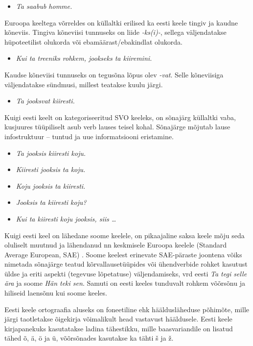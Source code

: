 \begin{multicols}{2}
\begin{itemize}
\item[] \textit{Ta saabub homme.}
\end{itemize}

Euroopa keeltega võrreldes on küllaltki erilised ka eesti keele tingiv ja kaudne kõneviis. 
Tingiva kõneviisi tunnuseks on liide \textit{-ks(i)-}, sellega väljendatakse hüpoteetilist olukorda või ebamäärast/ebakind\-lat olukorda.

\begin{itemize}
\item[] \textit{Kui ta treeniks rohkem, jookseks ta kiire\-mini.}
\end{itemize}

Kaudse kõneviisi tunnuseks on tegusõna lõpus olev \textit{-vat}. 
Selle kõneviisiga väljendatakse sündmusi, millest teatakse kuulu järgi.

\begin{itemize}
\item[] \textit{Ta jooksvat kiiresti.}
\end{itemize}

Kuigi eesti keelt on kategoriseeritud SVO keeleks, on sõnajärg küllaltki vaba, kusjuures tüüpiliselt asub verb lauses teisel kohal. Sõnajärge mõjutab lause infostruktuur -- tuntud ja uue informatsiooni eristamine.

\begin{itemize}
\item \textit{Ta jooksis kiiresti koju.}
\item \textit{Kiiresti jooksis ta koju.} 	
\item \textit{Koju jooksis ta kiiresti.} 	
\item \textit{Jooksis ta kiiresti koju?} 	
\item \textit{Kui ta kiiresti koju jooksis, siis \dots}
\end{itemize}

Kuigi eesti keel on lähedane soome keelele, on pikaajaline saksa keele mõju seda oluliselt muutnud ja lähendanud nn kesk\-misele Euroopa keelele (Standard Average European, SAE) \cite{Metslang09}.  Soome keelest erinevate SAE-päraste joontena võiks nimetada sõnajärge teatud kõrvallausetüüpides või ühendverbide rohket kasutust üldse ja eriti aspekti (tegevuse lõpetatuse) väljendamiseks, vrd eesti \textit{Ta tegi selle ära} ja soome \textit{Hän teki sen}.  Samuti on eesti keeles tunduvalt rohkem võõrsõnu ja hiliseid laensõnu kui soome keeles.

Eesti keele ortograafia aluseks on foneetiline ehk hääldusläheduse põhimõte, mille järgi taotletakse õigekirja võimalikult head vastavust hääldusele.  Eesti keele kirjapanekuks kasutatakse ladina tähestikku, mille baasvariandile on lisatud tähed õ, ä, ö ja ü, võõrsõnades kasutakse ka tähti š ja ž.


\end{multicols}
